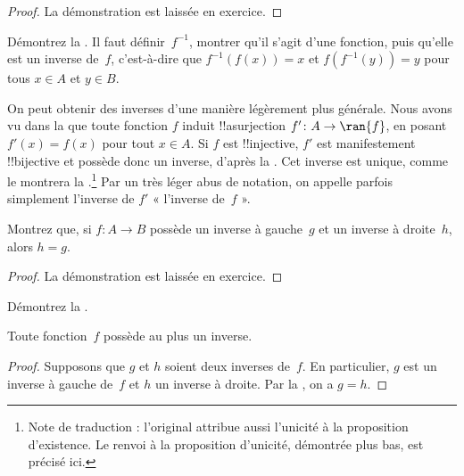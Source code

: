 \documentclass[11pt,a4paper,openany]{memoir}
\begin{document}
\begin{proof}
La démonstration est laissée en exercice.
\end{proof}

\begin{prob}
Démontrez la .
Il faut définir~$f^{-1}$, montrer qu’il s’agit d’une fonction, puis
qu’elle est un inverse de~$f$, c’est-à-dire que $f^{-1}(f(x)) = x$ et
$f(f^{-1}(y)) = y$ pour tous $x \in A$ et $y \in B$.
\end{prob}

\begin{explain}
On peut obtenir des inverses d’une manière légèrement plus générale.
Nous avons vu dans la  que toute fonction $f$ induit
!!a{surjection} $f'\colon A \to \ran{f}$, en posant $f'(x) = f(x)$
pour tout $x \in A$. Si $f$ est !!{injective}, $f'$ est manifestement
!!{bijective} et possède donc un inverse, d’après la
. Cet inverse est unique, comme le
montrera la .\footnote{Note de traduction :
l’original attribue aussi l’unicité à la proposition d’existence.
Le renvoi à la proposition d’unicité, démontrée plus bas, est précisé ici.}
Par un très léger abus de notation,
on appelle parfois simplement l’inverse de $f'$ « l’inverse de~$f$ ».
\end{explain}

\begin{prop}%
Montrez que, si $f\colon A \to B$ possède un inverse à gauche~$g$
et un inverse à droite~$h$, alors $h = g$.
\end{prop}

\begin{proof}
La démonstration est laissée en exercice.
\end{proof}

\begin{prob}
Démontrez la .
\end{prob}

\begin{prop}
Toute fonction~$f$ possède au plus un inverse.
\end{prop}

\begin{proof}
Supposons que $g$ et $h$ soient deux inverses de~$f$. En particulier,
$g$ est un inverse à gauche de~$f$ et $h$ un inverse à droite.
Par la , on a $g = h$.
\end{proof}
\end{document}
